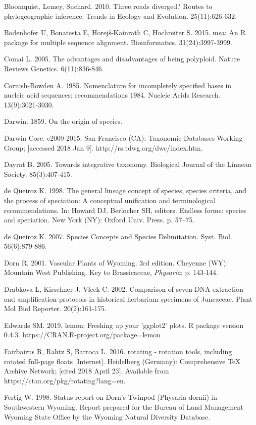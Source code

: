 Bloomquist, Lemey, Suchard. 2010. Three roads diverged? Routes to phylogeographic inference. Trends in Ecology and Evolution. 25(11):626-632.

Bodenhofer U, Bonatesta E, Horej\v{s}-Kainrath C, Hochreiter S. 2015. msa: An R package for multiple sequence alignment. Bioinformatics. 31(24):3997-3999. 

Comai L. 2005. The advantages and disadvantages of being polyploid. Nature Reviews Genetics. 6(11):836-846.

Cornish-Bowden A. 1985. Nomenclature for incompletely specified bases in nucleic acid sequences: recommendations 1984.  Nucleic Acids Research. 13(9):3021-3030.

Darwin. 1859. On the origin of species.

Darwin Core. c2009-2015. San Francisco (CA): Taxonomic Databases Working Group; [accessed 2018 Jan 9]. http://rs.tdwg.org/dwc/index.htm.

Dayrat B. 2005. Towards integrative taxonomy. Biological Journal of the Linnean Society. 85(3):407-415.

de Queiroz K. 1998. The general lineage concept of species, species criteria, and the process of speciation: A conceptual unification and terminological recommendations. In: Howard DJ, Berlocher SH, editors. Endless forms: species and speciation. New York (NY): Oxford Univ. Press. p. 57–75.

de Queiroz K. 2007. Species Concepts and Species Delimitation. Syst. Biol. 56(6):879-886.

Dorn R. 2001. Vascular Plants of Wyoming. 3rd edition. Cheyenne (WY): Mountain West Publishing. Key to Brassicaceae, \textit{Physaria}; p. 143-144.

Drabkova L, Kirschner J, Vlcek C. 2002. Comparison of seven DNA extraction and amplification protocols in historical herbarium specimens of Juncaceae. Plant Mol Biol Reporter. 20(2):161-175.

Edwards SM. 2019. lemon: Freshing up your 'ggplot2' plots. R package version 0.4.3. https://CRAN.R-project.org/package=lemon

Fairbairns R, Rahtz S, Barroca L. 2016. rotating - rotation tools, including rotated full-page floats [Internet]. Heidelberg (Germany): Comprehensive TeX Archive Network; [cited 2018 April 23]. Available from https://ctan.org/pkg/rotating?lang=en.

Fertig W. 1998. Status report on Dorn’s Twinpod (Physaria dornii) in Southwestern Wyoming. Report prepared for the Bureau of Land Management Wyoming State Office by the Wyoming Natural Diversity Database.  

